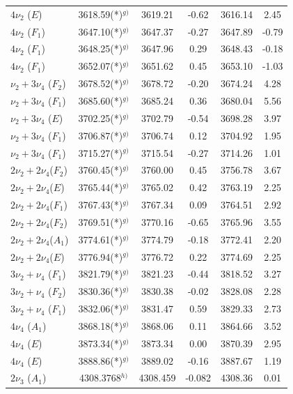 \begin{longtable}{lccccc}
$4\nu_2      $ ($E  $) & 3618.59(*)$^{g)}$ & 3619.21 & -0.62 & 3616.14 & 2.45 \\
$4\nu_2      $ ($F_1$) & 3647.10(*)$^{g)}$ & 3647.37 & -0.27 & 3647.89 & -0.79 \\
$4\nu_2      $ ($F_1$) & 3648.25(*)$^{g)}$ & 3647.96 & 0.29 & 3648.43 & -0.18 \\
$4\nu_2      $ ($F_1$) & 3652.07(*)$^{g)}$ & 3651.62 & 0.45 & 3653.10 & -1.03 \\
$\nu_2+3\nu_4$ ($F_2$) & 3678.52(*)$^{g)}$ & 3678.72 & -0.20 & 3674.24 & 4.28 \\
$\nu_2+3\nu_4$ ($F_1$) & 3685.60(*)$^{g)}$ & 3685.24 & 0.36 & 3680.04 & 5.56 \\
$\nu_2+3\nu_4$ ($E  $) & 3702.25(*)$^{g)}$ & 3702.79 & -0.54 & 3698.28 & 3.97 \\
$\nu_2+3\nu_4$ ($F_1$) & 3706.87(*)$^{g)}$ & 3706.74 & 0.12 & 3704.92 & 1.95 \\
$\nu_2+3\nu_4$ ($F_1$) & 3715.27(*)$^{g)}$ & 3715.54 & -0.27 & 3714.26 & 1.01 \\
$2\nu_2+2\nu_4$($F_2$) & 3760.45(*)$^{g)}$ & 3760.00 & 0.45 & 3756.78 & 3.67 \\
$2\nu_2+2\nu_4$($E  $) & 3765.44(*)$^{g)}$ & 3765.02 & 0.42 & 3763.19 & 2.25 \\
$2\nu_2+2\nu_4$($F_1$) & 3767.43(*)$^{g)}$ & 3767.34 & 0.09 & 3764.51 & 2.92 \\
$2\nu_2+2\nu_4$($F_2$) & 3769.51(*)$^{g)}$ & 3770.16 & -0.65 & 3765.96 & 3.55 \\
$2\nu_2+2\nu_4$($A_1$) & 3774.61(*)$^{g)}$ & 3774.79 & -0.18 & 3772.41 & 2.20 \\
$2\nu_2+2\nu_4$($E  $) & 3776.94(*)$^{g)}$ & 3776.72 & 0.22 & 3774.69 & 2.25 \\
$3\nu_2+\nu_4$ ($F_1$) & 3821.79(*)$^{g)}$ & 3821.23 & -0.44 & 3818.52 & 3.27 \\
$3\nu_2+\nu_4$ ($F_2$) & 3830.36(*)$^{g)}$ & 3830.38 & -0.02 & 3828.08 & 2.28 \\
$3\nu_2+\nu_4$ ($F_1$) & 3832.06(*)$^{g)}$ & 3831.47 & 0.59 & 3829.33 & 2.73 \\
$4\nu_4      $ ($A_1$) & 3868.18(*)$^{g)}$ & 3868.06 & 0.11 & 3864.66 & 3.52 \\
$4\nu_4      $ ($E  $) & 3873.34(*)$^{g)}$ & 3873.34 & 0.00 & 3870.39 & 2.95 \\
$4\nu_4      $ ($E  $) & 3888.86(*)$^{g)}$ & 3889.02 & -0.16 & 3887.67 & 1.19 \\
$2\nu_3$ ($A_1$) & 4308.3768$^{h)}$ & 4308.459 & -0.082 & 4308.36 & 0.01 \\

\end{longtable}
